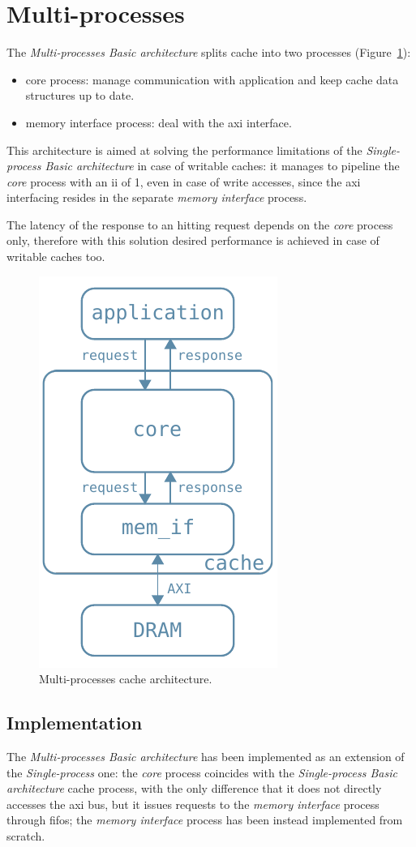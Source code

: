 \documentclass[11pt,a4paper,oneside]{memoir}
\begin{document}
\section{Multi-processes}
The \emph{Multi-processes Basic architecture} splits cache into two processes
(Figure~\ref{fig:basic_arch_inner}):
\begin{itemize}
	\item core process: manage communication with application and keep
		cache data structures up to date.
	\item memory interface process: deal with the \ac{axi} interface.
\end{itemize}

This architecture is aimed at solving the performance limitations of the
\emph{Single-process Basic architecture} in case of writable caches: it manages
to pipeline the \emph{core} process with an \ac{ii} of 1, even in case of write
accesses, since the \ac{axi} interfacing resides in the separate \emph{memory
interface} process.

The latency of the response to an hitting request depends on the \emph{core}
process only, therefore with this solution desired performance is achieved in
case of writable caches too.

\begin{figure}
	\centering
	\includegraphics[width=.3\textwidth]{basic_arch_inner}
	\caption{Multi-processes cache architecture.}
	\label{fig:basic_arch_inner}
\end{figure}

\subsection{Implementation}
The \emph{Multi-processes Basic architecture} has been implemented as an
extension of the \emph{Single-process} one: the \emph{core} process coincides
with the \emph{Single-process Basic architecture} cache process, with the only
difference that it does not directly accesses the \ac{axi} bus, but it issues
requests to the \emph{memory interface} process through \acp{fifo}; the
\emph{memory interface} process has been instead implemented from scratch.
\end{document}
